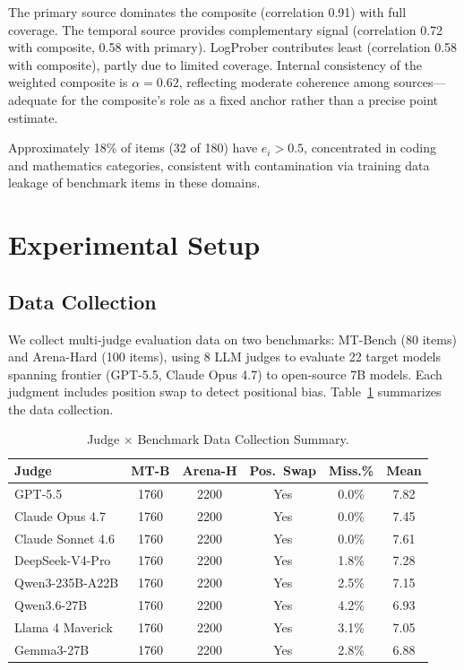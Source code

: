 \documentclass[11pt]{article}
\newcommand{\ei}{e_i}
\begin{document}
The primary source dominates the composite (correlation 0.91) with full coverage.
The temporal source provides complementary signal (correlation 0.72 with composite, 0.58 with primary).
LogProber contributes least (correlation 0.58 with composite), partly due to limited coverage.
Internal consistency of the weighted composite is $\alpha = 0.62$, reflecting moderate coherence among sources---adequate for the composite's role as a fixed anchor rather than a precise point estimate.

Approximately 18\% of items (32 of 180) have $\ei > 0.5$, concentrated in coding and mathematics categories, consistent with contamination via training data leakage of benchmark items in these domains.

\section{Experimental Setup}
\label{sec:setup}

\subsection{Data Collection}

We collect multi-judge evaluation data on two benchmarks: MT-Bench (80 items) and Arena-Hard (100 items), using 8 LLM judges to evaluate 22 target models spanning frontier (GPT-5.5, Claude Opus 4.7) to open-source 7B models.
Each judgment includes position swap to detect positional bias.
Table~\ref{tab:data_collection} summarizes the data collection.

\begin{table}[t]
\centering
\caption{Judge $\times$ Benchmark Data Collection Summary.}
\label{tab:data_collection}
\small
\begin{tabular}{lccccc}
\toprule
Judge & MT-B & Arena-H & Pos.\ Swap & Miss.\% & Mean \\
\midrule
GPT-5.5 & 1760 & 2200 & Yes & 0.0\% & 7.82 \\
Claude Opus 4.7 & 1760 & 2200 & Yes & 0.0\% & 7.45 \\
Claude Sonnet 4.6 & 1760 & 2200 & Yes & 0.0\% & 7.61 \\
DeepSeek-V4-Pro & 1760 & 2200 & Yes & 1.8\% & 7.28 \\
Qwen3-235B-A22B & 1760 & 2200 & Yes & 2.5\% & 7.15 \\
Qwen3.6-27B & 1760 & 2200 & Yes & 4.2\% & 6.93 \\
Llama 4 Maverick & 1760 & 2200 & Yes & 3.1\% & 7.05 \\
Gemma3-27B & 1760 & 2200 & Yes & 2.8\% & 6.88 \\
\bottomrule
\end{tabular}
\end{table}
\end{document}
